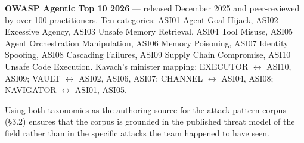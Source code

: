 \textbf{OWASP Agentic Top 10 2026} — released December 2025 and peer-reviewed by
over 100 practitioners. Ten categories: ASI01 Agent Goal Hijack, ASI02
Excessive Agency, ASI03 Unsafe Memory Retrieval, ASI04 Tool Misuse, ASI05
Agent Orchestration Manipulation, ASI06 Memory Poisoning, ASI07 Identity
Spoofing, ASI08 Cascading Failures, ASI09 Supply Chain Compromise, ASI10
Unsafe Code Execution. Kavach's minister mapping:
EXECUTOR $\leftrightarrow$ ASI10, ASI09;
VAULT $\leftrightarrow$ ASI02, ASI06, ASI07;
CHANNEL $\leftrightarrow$ ASI04, ASI08;
NAVIGATOR $\leftrightarrow$ ASI01, ASI05.

Using both taxonomies as the authoring source for the attack-pattern corpus (§3.2)
ensures that the corpus is grounded in the published threat model of the field
rather than in the specific attacks the team happened to have seen.
